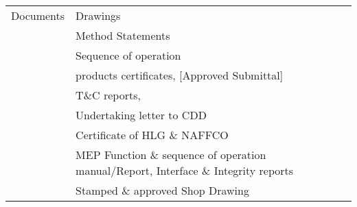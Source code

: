 {\begin{longtable}{p{2.3cm}p{4.2cm}p{4.2cm}}
Documents	&Drawings &\\
	&Method Statements &\\
	&Sequence of operation &\\
	&products certificates, [Approved Submittal] &\\
	&T\&C reports, &\\
	&Undertaking letter to CDD &\\
	&Certificate of HLG \& NAFFCO &\\
	&MEP Function \& sequence of operation manual/Report, Interface \& Integrity reports &\\
	&Stamped \& approved Shop Drawing &\\
\bottomrule
\end{longtable}
}




